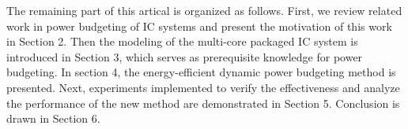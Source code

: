 The remaining part of this artical is organized as follows. First, we review related work in power budgeting of IC systems and present the motivation of this work in Section 2. Then the modeling of the multi-core packaged IC system is introduced in Section 3, which serves as prerequisite knowledge for power budgeting. In section 4, the energy-efficient dynamic power budgeting method is presented. Next, experiments implemented to verify the effectiveness and analyze the performance of the new method are demonstrated in Section 5. Conclusion is drawn in Section 6.